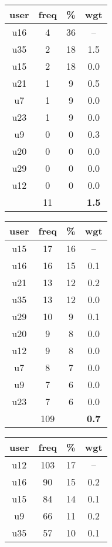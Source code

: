 \begin{appendices}
\begin{table}
\centering
\begin{tabular}{ |c|c|c|c| }
	\hline
	\textbf{user} & \textbf{freq} & \textbf{\%} & \textbf{wgt} \\
	\hline
	u16 & 4 & 36 & -- \\
	u35 & 2 & 18 & 1.5 \\
	u15 & 2 & 18 & 0.0 \\
	u21 & 1 & 9 & 0.5 \\
	u7 & 1 & 9 & 0.0 \\
	u23 & 1 & 9 & 0.0 \\
	u9 & 0 & 0 & 0.3 \\
	u20 & 0 & 0 & 0.0 \\
	u29 & 0 & 0 & 0.0 \\
	u12 & 0 & 0 & 0.0 \\
	 & 11 & & \textbf{1.5} \\
	\hline
\end{tabular}
\begin{tabular}{ |c|c|c|c| }
	\hline
	\textbf{user} & \textbf{freq} & \textbf{\%} & \textbf{wgt} \\
	\hline
	u15 & 17 & 16 & -- \\
	u16 & 16 & 15 & 0.1 \\
	u21 & 13 & 12 & 0.2 \\
	u35 & 13 & 12 & 0.0 \\
	u29 & 10 & 9 & 0.1 \\
	u20 & 9 & 8 & 0.0 \\
	u12 & 9 & 8 & 0.0 \\
	u7 & 8 & 7 & 0.0 \\
	u9 & 7 & 6 & 0.0 \\
	u23 & 7 & 6 & 0.0 \\
	 & 109 & & \textbf{0.7} \\
	\hline
\end{tabular}
\begin{tabular}{ |c|c|c|c| }
	\hline
	\textbf{user} & \textbf{freq} & \textbf{\%} & \textbf{wgt} \\
	\hline
	u12 & 103 & 17 & -- \\
	u16 & 90 & 15 & 0.2 \\
	u15 & 84 & 14 & 0.1 \\
	u9 & 66 & 11 & 0.2 \\
	u35 & 57 & 10 & 0.1 \\

\end{tabular}
\end{table}
\end{appendices}
